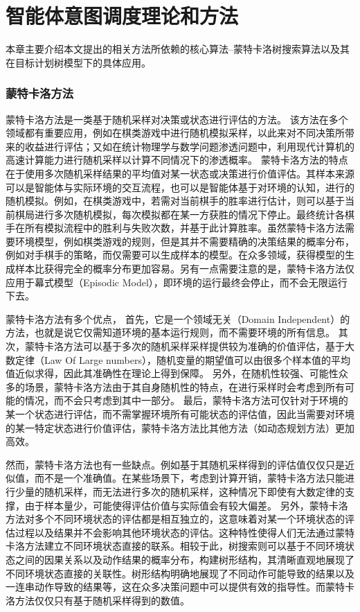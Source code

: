 \chapter{智能体意图调度理论和方法}
本章主要介绍本文提出的相关方法所依赖的核心算法--蒙特卡洛树搜索算法以及其在目标计划树模型下的具体应用。
\subsection{蒙特卡洛方法}
蒙特卡洛方法是一类基于随机采样对决策或状态进行评估的方法。
该方法在多个领域都有重要应用，例如在棋类游戏中进行随机模拟采样，以此来对不同决策所带来的收益进行评估；又如在统计物理学与数学问题渗透问题中，利用现代计算机的高速计算能力进行随机采样以计算不同情况下的渗透概率。
蒙特卡洛方法的特点在于使用多次随机采样结果的平均值对某一状态或决策进行价值评估。其样本来源可以是智能体与实际环境的交互流程，也可以是智能体基于对环境的认知，进行的随机模拟。例如，在棋类游戏中，若需对当前棋手的胜率进行估计，则可以基于当前棋局进行多次随机模拟，每次模拟都在某一方获胜的情况下停止。最终统计各棋手在所有模拟流程中的胜利与失败次数，并基于此计算胜率。虽然蒙特卡洛方法需要环境模型，例如棋类游戏的规则，但是其并不需要精确的决策结果的概率分布，例如对手棋手的策略，而仅需要可以生成样本的模型。在众多领域，获得模型的生成样本比获得完全的概率分布更加容易。另有一点需要注意的是，蒙特卡洛方法仅应用于幕式模型（Episodic Model），即环境的运行最终会停止，而不会无限运行下去。

蒙特卡洛方法有多个优点，
首先，它是一个领域无关（Domain Independent）的方法，也就是说它仅需知道环境的基本运行规则，而不需要环境的所有信息。
%
其次，蒙特卡洛方法可以基于多次的随机采样采样提供较为准确的价值评估，基于大数定律（Law Of Large numbers），随机变量的期望值可以由很多个样本值的平均值近似求得，因此其准确性在理论上得到保障。
%
另外，在随机性较强、可能性众多的场景，蒙特卡洛方法由于其自身随机性的特点，在进行采样时会考虑到所有可能的情况，而不会只考虑到其中一部分。
%
最后，蒙特卡洛方法可仅针对于环境的某一个状态进行评估，而不需掌握环境所有可能状态的评估值，因此当需要对环境的某一特定状态进行价值评估，蒙特卡洛方法比其他方法（如动态规划方法）更加高效。

然而，蒙特卡洛方法也有一些缺点。例如基于其随机采样得到的评估值仅仅只是近似值，而不是一个准确值。在某些场景下，考虑到计算开销，蒙特卡洛方法只能进行少量的随机采样，而无法进行多次的随机采样，这种情况下即使有大数定律的支撑，由于样本量少，可能使得评估价值与实际值会有较大偏差。
%
另外，蒙特卡洛方法对多个不同环境状态的评估都是相互独立的，这意味着对某一个环境状态的评估过程以及结果并不会影响其他环境状态的评估。这种特性使得人们无法通过蒙特卡洛方法建立不同环境状态直接的联系。相较于此，树搜索则可以基于不同环境状态之间的因果关系以及动作结果的概率分布，构建树形结构，其清晰直观地展现了不同环境状态直接的关联性。树形结构明确地展现了不同动作可能导致的结果以及一连串动作导致的结果等，这在众多决策问题中可以提供有效的指导性。而蒙特卡洛方法仅仅只有基于随机采样得到的数值。
